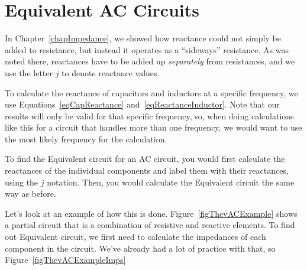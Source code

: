 \chapter{\thev Equivalent AC Circuits}
\label{appThevEquivAC}



In Chapter~\ref{chapImpedance}, we showed how reactance could not simply be added to resistance, but instead it operates as a ``sideways'' resistance.
As was noted there, reactances have to be added up \emph{separately} from resistances, and we use the letter $j$ to denote reactance values.

To calculate the reactance of capacitors and inductors at a specific frequency, we use Equations~\ref{eqCapReactance} and~\ref{eqReactanceInductor}.
Note that our results will only be valid for that specific frequency, so, when doing calculations like this for a circuit that handles more than one frequency, we would want to use the most likely frequency for the calculation.

To find the \thev Equivalent circuit for an AC circuit, you would first calculate the reactances of the individual components and label them with their reactances, using the $j$ notation.
Then, you would calculate the \thev Equivalent circuit the same way as before.


Let's look at an example of how this is done.
Figure~\ref{figThevACExample} shows a partial circuit that is a combination of resistive and reactive elements.
To find out \thev Equivalent circuit, we first need to calculate the impedances of each component in the circuit.  
We've already had a lot of practice with that, so Figure~\ref{figThevACExampleImps}


